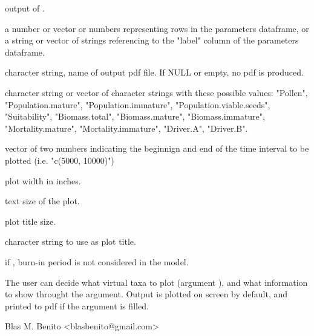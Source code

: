\documentclass[letterpaper]{book}
\begin{document}
%
\begin{Arguments}
\begin{ldescription}
\item[\code{simulation.output}] output of .

\item[\code{species}] a number or vector or numbers representing rows in the parameters dataframe, or a string or vector of strings referencing to the "label" column of the parameters dataframe.

\item[\code{filename}] character string, name of output pdf file. If NULL or empty, no pdf is produced.

\item[\code{columns}] character string or vector of character strings with these possible values: "Pollen", "Population.mature", "Population.immature", "Population.viable.seeds", "Suitability", "Biomass.total", "Biomass.mature", "Biomass.immature", "Mortality.mature", "Mortality.immature", "Driver.A", "Driver.B".

\item[\code{time.zoom}] vector of two numbers indicating the beginnign and end of the time interval to be plotted (i.e. "c(5000, 10000)")

\item[\code{width}] plot width in inches.

\item[\code{text.size}] text size of the plot.

\item[\code{title.size}] plot title size.

\item[\code{plot.title}] character string to use as plot title.

\item[\code{burnin}] if , burn-in period is not considered in the model.
\end{ldescription}
\end{Arguments}
%
\begin{Details}\relax
The user can decide what virtual taxa to plot (argument ), and what information to show throught the  argument. Output is plotted on screen by default, and printed to pdf if the  argument is filled.
\end{Details}
%
\begin{Author}\relax
Blas M. Benito  <blasbenito@gmail.com>
\end{Author}
\end{document}
